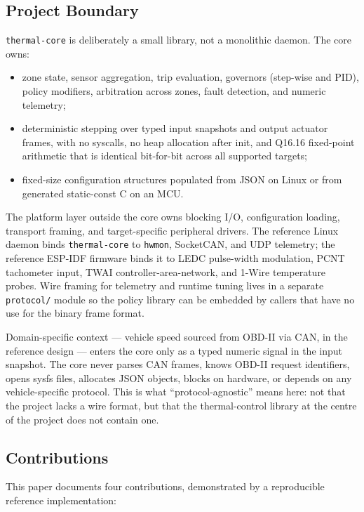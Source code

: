 \subsection{Project Boundary}

\texttt{thermal-core} is deliberately a small library, not a monolithic daemon. The core owns:

\begin{itemize}[leftmargin=*]
    \item zone state, sensor aggregation, trip evaluation, governors (step-wise and PID), policy modifiers, arbitration across zones, fault detection, and numeric telemetry;
    \item deterministic stepping over typed input snapshots and output actuator frames, with no syscalls, no heap allocation after init, and Q16.16 fixed-point arithmetic that is identical bit-for-bit across all supported targets;
    \item fixed-size configuration structures populated from JSON on Linux or from generated static-const C on an MCU.
\end{itemize}

The platform layer outside the core owns blocking I/O, configuration loading, transport framing, and target-specific peripheral drivers. The reference Linux daemon binds \texttt{thermal-core} to \texttt{hwmon}, SocketCAN, and UDP telemetry; the reference ESP-IDF firmware binds it to LEDC pulse-width modulation, PCNT tachometer input, TWAI controller-area-network, and 1-Wire temperature probes. Wire framing for telemetry and runtime tuning lives in a separate \texttt{protocol/} module so the policy library can be embedded by callers that have no use for the binary frame format.

Domain-specific context --- vehicle speed sourced from OBD-II via CAN, in the reference design --- enters the core only as a typed numeric signal in the input snapshot. The core never parses CAN frames, knows OBD-II request identifiers, opens sysfs files, allocates JSON objects, blocks on hardware, or depends on any vehicle-specific protocol. This is what ``protocol-agnostic'' means here: not that the project lacks a wire format, but that the thermal-control library at the centre of the project does not contain one.

\subsection{Contributions}

This paper documents four contributions, demonstrated by a reproducible reference implementation:

